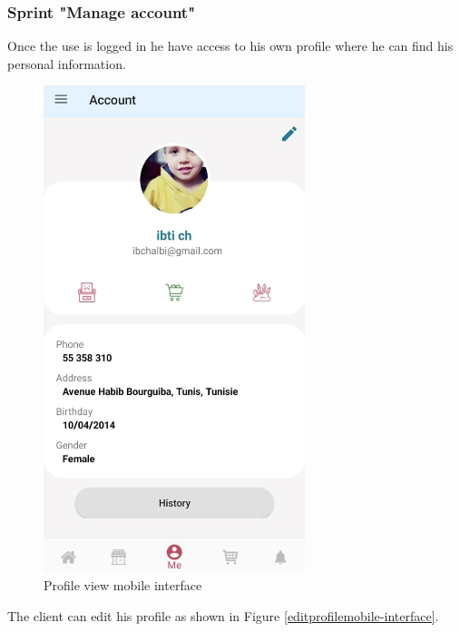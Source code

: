 \documentclass[12pt,a4paper]{report}
\begin{document}
\subsubsection*{Sprint "Manage account"}
Once the use is logged in he have access to his own profile where he can find his personal information.
\begin{figure}[H]
	\vspace*{1in}
	\centering
	\includegraphics[width=3in,keepaspectratio]{profilemobile.jpg}
	\caption{Profile view mobile interface}
	\label{profilemobile-interface}
\end{figure}
\clearpage
The client can edit his profile as shown in Figure \ref{editprofilemobile-interface}.
\end{document}
